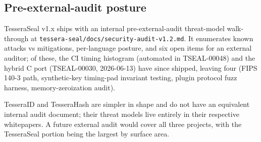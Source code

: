 \subsection{Pre-external-audit posture}

TesseraSeal v1.x ships with an internal pre-external-audit threat-model walk-through at \texttt{tessera-seal/docs/security-audit-v1.2.md}. It enumerates known attacks vs mitigations, per-language posture, and six open items for an external auditor; of these, the CI timing histogram (automated in TSEAL-00048) and the hybrid C port (TSEAL-00030, 2026-06-13) have since shipped, leaving four (FIPS 140-3 path, synthetic-key timing-pad invariant testing, plugin protocol fuzz harness, memory-zeroization audit).

TesseraID and TesseraHash are simpler in shape and do not have an equivalent internal audit document; their threat models live entirely in their respective whitepapers. A future external audit would cover all three projects, with the TesseraSeal portion being the largest by surface area.
